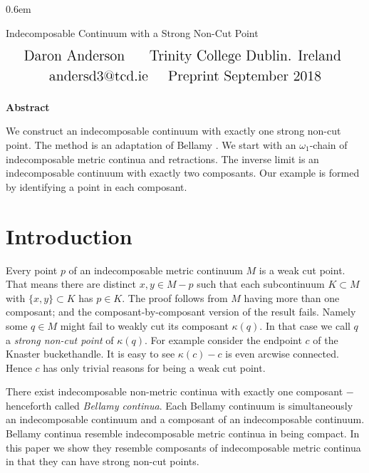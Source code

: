 \documentclass[12pt]{article}
\theoremstyle{plain}
\theoremstyle{definition}
\newcommand{\K}{\ensuremath{\kappa}}
\newcommand{\W}{\ensuremath{\omega}}
\newcommand{\0}{\ensuremath{\varnothing}}
\begin{document}
 

\openup 0.6em

\fontsize{13}{5}
\selectfont
 
	 
	
	\begin{center}\LARGE Indecomposable Continuum with a Strong Non-Cut Point
	\end{center}
	
	\begin{align*}
	\text{\Large Daron Anderson }  \qquad \text{\Large Trinity College Dublin. Ireland }  
	\end{align*} 
	\begin{align*} \text{\Large andersd3@tcd.ie} \qquad \text{\Large Preprint September 2018}  
	\end{align*}$ $\\
	
	
	
	
	\begin{center}
		\textbf{ \large Abstract}
	\end{center}\noindent We construct an indecomposable continuum with exactly one strong non-cut point.
		The method is an adaptation of Bellamy \cite{one}.
		We start with an $\W_1$-chain of indecomposable metric continua and retractions.
		The inverse limit is an indecomposable continuum with exactly two composants.
		Our example is formed by identifying a point in each composant.  
	\section{Introduction}
	
	
	\noindent
	Every point $p$ of an indecomposable metric continuum $M$ is a weak cut point. 
	That means there are distinct $x,y \in M-p$ such that each subcontinuum $K \subset M$ with $\{x,y\} \subset K$ has $p \in K$.
	The proof follows from $M$ having more than one composant; and the composant-by-composant version of the result fails.
	Namely some $q \in M$ might fail to weakly cut its composant $\K(q)$. In that case we call $q$ a {\it strong non-cut point} of $\K(q)$.
	For example consider the endpoint $c$ of the Knaster buckethandle.
	It is easy to see $\K(c)-c$ is even arcwise connected.
	Hence $c$ has only trivial reasons for being a weak cut point.
	
	There exist indecomposable non-metric continua with exactly one composant $-$ henceforth called \textit{Bellamy continua}.
	Each Bellamy continuum is simultaneously an indecomposable continuum and a composant of an indecomposable continuum.
	Bellamy continua resemble indecomposable metric continua in being compact.
	In this paper we show they resemble composants of indecomposable metric continua 
	in that they can have strong non-cut points.
	
\end{document}
